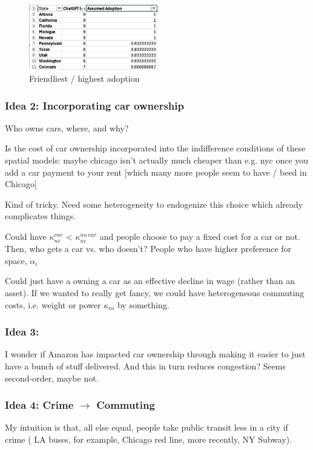 \documentclass{article}
\begin{document}
\begin{figure}
    \centering
    \includegraphics[width=0.5\textwidth]{img/friendly.png}
    \caption{Friendliest / highest adoption}
\end{figure}



\subsubsection{Idea 2: Incorporating car ownership}
Who owns cars, where, and why?

Is the cost of car ownership incorporated into the indifference conditions of these spatial models: maybe chicago isn't actually much cheaper than e.g. nyc once you add a car payment to your rent [which many more people seem to have / beed in Chicago] 


Kind of tricky. Need some heterogeneity to endogenize this choice which already complicates things.

Could have $\kappa^{car}_{ni}$ <
$\kappa^{no \ car}_{ni} $ and people choose to pay a fixed cost for a car or not. 
Then, who gets a car vs. who doesn't? 
People who have higher preference for space, $\alpha_i$

Could just have a owning a car as an effective decline in wage (rather than an asset).
If we wanted to really get fancy, we could have heterogeneous commuting costs, i.e. weight or power $\kappa_{ni}$ by something. 


\subsubsection{Idea 3: }
I wonder if Amazon has impacted car ownership through making it easier to just have a bunch of stuff delivered. 
And this in turn reduces congestion? Seems second-order, maybe not.

\subsubsection{Idea 4: Crime $\rightarrow$ Commuting}
My intuition is that, all else equal, people take public transit less in a city if crime ( LA buses, for example, Chicago red line, more recently, NY Subway).
\end{document}
